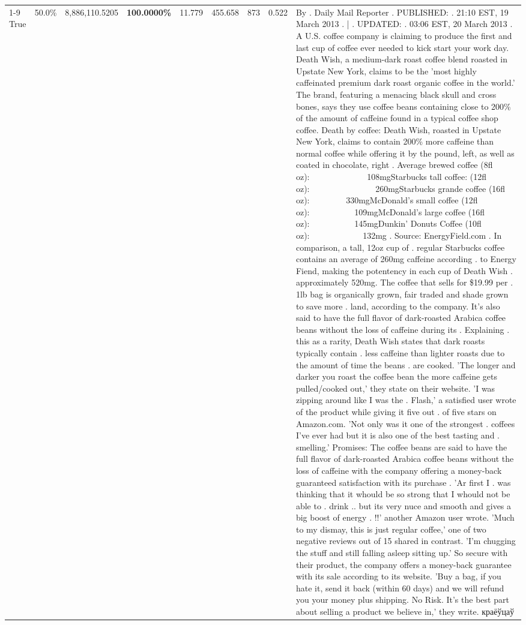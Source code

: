 \begin{table}[H]
{\begin{tabular}{lllrlllll}
\cline{1-9}
True & 50.0\% & 8,886,110.5205 & \bfseries \color{red} 100.0000\% & 11.779 & 455.658 & 873 & 0.522 & By . Daily Mail Reporter . PUBLISHED: . 21:10 EST, 19 March 2013 . | . UPDATED: . 03:06 EST, 20 March 2013 . A U.S. coffee company is claiming to produce the first and last cup of coffee ever needed to kick start your work day. Death Wish, a medium-dark roast coffee blend roasted in Upstate New York, claims to be the 'most highly caffeinated premium dark roast organic coffee in the world.' The brand, featuring a menacing black skull and cross bones, says they use coffee beans containing close to 200\% of the amount of caffeine found in a typical coffee shop coffee. Death by coffee: Death Wish, roasted in Upstate New York, claims to contain 200\% more caffeine than normal coffee while offering it by the pound, left, as well as coated in chocolate, right . Average brewed coffee (8fl oz):              108mgStarbucks tall coffee: (12fl oz):                260mgStarbucks grande coffee (16fl oz):         330mgMcDonald's small coffee (12fl oz):           109mgMcDonald's large coffee (16fl oz):           145mgDunkin' Donuts Coffee (10fl oz):             132mg . Source: EnergyField.com . In comparison, a tall, 12oz cup of . regular Starbucks coffee contains an average of 260mg caffeine according . to Energy Fiend, making the potentency in each cup of Death Wish . approximately 520mg. The coffee that sells for \$19.99 per . 1lb bag is organically grown, fair traded and shade grown to save more . land, according to the company. It's also said to have the full flavor of dark-roasted Arabica coffee beans without the loss of caffeine during its . Explaining . this as a rarity, Death Wish states that dark roasts typically contain . less caffeine than lighter roasts due to the amount of time the beans . are cooked. 'The longer and darker you roast the coffee bean the more caffeine gets pulled/cooked out,' they state on their website. 'I was zipping around like I was the . Flash,' a satisfied user wrote of the product while giving it five out . of five stars on Amazon.com. 'Not only was it one of the strongest . coffees I've ever had but it is also one of the best tasting and . smelling.’ Promises: The coffee beans are said to have the full flavor of dark-roasted Arabica coffee beans without the loss of caffeine with the company offering a money-back guaranteed satisfaction with its purchase . 'Ar first I . was thinking that it whould be so strong that I whould not be able to . drink .. but its very nuce and smooth and gives a big boost of energy . !!' another Amazon user wrote. 'Much to my dismay, this is just regular coffee,' one of two negative reviews out of 15 shared in contrast. 'I'm chugging the stuff and still falling asleep sitting up.' So secure with their product, the company offers a money-back guarantee with its sale according to its website. 'Buy a bag, if you hate it, send it back (within 60 days) and we will refund you your money plus shipping. No Risk. It’s the best part about selling a product we believe in,' they write. краёўцаў \\

\end{tabular}}
\end{table}
